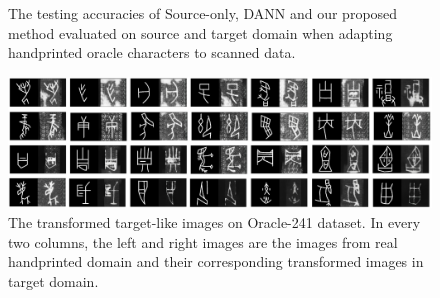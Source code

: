 \documentclass[10pt,journal,compsoc,twocolumn ]{IEEEtran}
\begin{document}
\begin{figure}
\centering
{}
\hspace{0cm}
\caption{The testing accuracies of Source-only, DANN and our proposed method evaluated on source and target domain when adapting handprinted oracle characters to scanned data.}
\label{Convergence} %
\end{figure}

\begin{figure}
\centering
\includegraphics[width=16cm]{transfromed_scan_data.pdf}
\caption{The transformed target-like images on Oracle-241 dataset. In every two columns, the left and right images are the images from real handprinted domain and their corresponding transformed images in target domain.}
\label{transfromed_scan} %
\end{figure}
\end{document}
